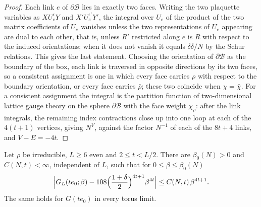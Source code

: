 \begin{proof}
Each link $e$ of $\partial\mathcal B$ lies in exactly two faces. Writing
the two plaquette variables as $XU_e^{\epsilon}Y$ and $X'U_e^{\epsilon'}Y'$,
the integral over $U_e$ of the product of the two matrix coefficients of
$U_e$ vanishes unless the two representations of $U_e$ appearing are dual
to each other, that is, unless $R'$ restricted along $e$ is $\bar R$ with
respect to the induced orientations; when it does not vanish it equals
$\delta\delta/N$ by the Schur relations. This gives the last statement.
Choosing the orientation of $\partial\mathcal B$ as the boundary of the
box, each link is traversed in opposite directions by its two faces, so a
consistent assignment is one in which every face carries $\rho$ with
respect to the boundary orientation, or every face carries $\bar\rho$;
these two coincide when $\chi=\bar\chi$. For a consistent assignment the
integral is the partition function of two-dimensional lattice gauge theory
on the sphere $\partial\mathcal B$ with the face weight $\chi_\rho$: after
the link integrals, the remaining index contractions close up into one
loop at each of the $4(t+1)$ vertices, giving $N^{V}$, against the factor
$N^{-1}$ of each of the $8t+4$ links, and $V-E=-4t$.
\end{proof}

\begin{theorem}\label{rEtwo:taylor}
Let $\rho$ be irreducible, $L\ge6$ even and $2\le t<L/2$. There are
$\beta_0(N)>0$ and $C(N,t)<\infty$, independent of $L$, such that for
$0\le\beta\le\beta_0(N)$
\[
\Bigl|G_L(te_0;\beta)-108\Bigl(\frac{1+\delta}2\Bigr)^{4t+1}\beta^{4t}\Bigr|
\le C(N,t)\,\beta^{4t+1}.
\]
The same holds for $G(te_0)$ in every torus limit.
\end{theorem}

